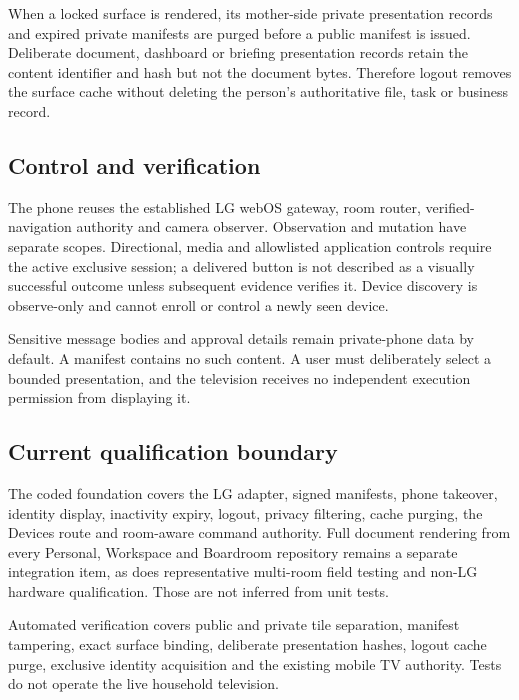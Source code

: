 When a locked surface is rendered, its mother-side private presentation records and
expired private manifests are purged before a public manifest is issued.  Deliberate
document, dashboard or briefing presentation records retain the content identifier
and hash but not the document bytes.  Therefore logout removes the surface cache
without deleting the person's authoritative file, task or business record.

\subsection{Control and verification}

The phone reuses the established LG webOS gateway, room router, verified-navigation
authority and camera observer.  Observation and mutation have separate scopes.
Directional, media and allowlisted application controls require the active exclusive
session; a delivered button is not described as a visually successful outcome unless
subsequent evidence verifies it.  Device discovery is observe-only and cannot enroll
or control a newly seen device.

Sensitive message bodies and approval details remain private-phone data by default.
A manifest contains no such content.  A user must deliberately select a bounded
presentation, and the television receives no independent execution permission from
displaying it.

\subsection{Current qualification boundary}

The coded foundation covers the LG adapter, signed manifests, phone takeover,
identity display, inactivity expiry, logout, privacy filtering, cache purging, the
Devices route and room-aware command authority.  Full document rendering from every
Personal, Workspace and Boardroom repository remains a separate integration item, as
does representative multi-room field testing and non-LG hardware qualification.
Those are not inferred from unit tests.

Automated verification covers public and private tile separation, manifest
tampering, exact surface binding, deliberate presentation hashes, logout cache purge,
exclusive identity acquisition and the existing mobile TV authority.  Tests do not
operate the live household television.
